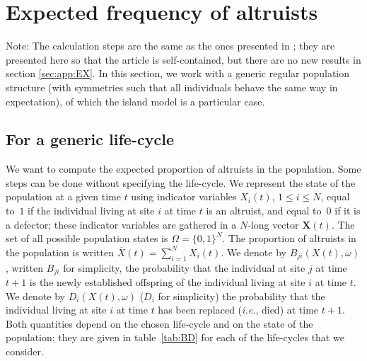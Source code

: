 \documentclass[11pt, letterpaper]{article}
\newcommand{\ie}{\textit{i.e.}}
\begin{document}
\section{Expected frequency of altruists\label{sec:app:EX}}

Note: The calculation steps are the same as the ones presented in \citet{Debarre2017}; they are presented here so that the article is self-contained, but there are no new results in section \ref{sec:app:EX}. In this section, we work with a generic regular population structure (with symmetries such that all individuals behave the same way in expectation), of which the island model is a particular case. 

\subsection{For a generic life-cycle \label{sec:app:generic}}

We want to compute the expected proportion of altruists in the population. Some steps can be done without specifying the life-cycle. We represent the state of the population at a given time $t$ using indicator variables $X_i(t)$, $1\leq i \leq N$, equal to~$1$ if the individual living at site $i$ at time $t$ is an altruist, and equal to~$0$ if it is a defector; these indicator variables are gathered in a $N$-long vector $\mathbf{X}(t)$. The set of all possible population states is $\Omega = \{0,1\}^N$. The proportion of altruists in the population is written $\overline{X}(t) = \sum_{i=1}^N X_i(t)$. We denote by $B_{ji}(X(t), \omega)$, written $B_{ji}$ for simplicity, the probability that the individual at site $j$ at time $t+1$ is the newly established offspring of the individual living at site $i$ at time $t$. We denote by $D_{i}(X(t), \omega)$ ($D_i$ for simplicity) the probability that the individual living at site $i$ at time $t$ has been replaced (\ie, died) at time $t+1$. Both quantities depend on the chosen life-cycle and on the state of the population; they are given in table~\ref{tab:BD} for each of the life-cycles that we consider. 
\end{document}
